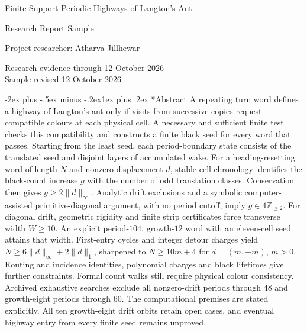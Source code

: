 \documentclass[11pt,letterpaper]{article}
\makeatletter
\renewcommand\section{\@startsection{section}{1}{\z@}%
  {-2ex plus -.5ex minus -.2ex}{1ex plus .2ex}%
  {\normalfont\Large\bfseries}}
\makeatother
\begin{document}
\begin{titlepage}
\centering
\vspace*{.8in}
{\LARGE Finite-Support Periodic Highways of Langton's Ant\par}
\vspace{.4in}
{\Large Research Report Sample\par}
\vspace{.6in}
{\large Project researcher: Atharva Jillhewar\par}
\vfill
Research evidence through 12 October 2026\\
Sample revised 12 October 2026\par
\end{titlepage}
\clearpage
\thispagestyle{empty}
\section*{Abstract}
A repeating turn word defines a highway of Langton's ant only if visits
from successive copies request compatible colours at each physical cell.
A necessary and sufficient finite test checks this compatibility and
constructs a finite black seed for every word that passes. Starting from
the least seed, each period-boundary state consists of the translated
seed and disjoint layers of accumulated wake. For a heading-resetting word of length $N$ and nonzero displacement
$d$, stable cell chronology identifies the black-count increase $g$ with
the number of odd translation classes. Conservation then gives
$g\ge2\|d\|_\infty$. Analytic drift exclusions and a symbolic
computer-assisted primitive-diagonal argument, with no period cutoff,
imply $g\in4\mathbb Z_{\ge2}$. For diagonal drift, geometric rigidity
and finite strip certificates force transverse width $W\ge10$.
An explicit period-$104$, growth-$12$ word with an eleven-cell seed
attains that width. First-entry cycles and integer detour charges yield
$N\ge6\|d\|_\infty+2\|d\|_1$, sharpened to $N\ge10m+4$
for $d=(m,-m)$, $m>0$. Routing and incidence identities, polynomial charges and black lifetimes
give further constraints. Formal count walks still require physical
colour consistency. Archived exhaustive
searches exclude all nonzero-drift periods through $48$ and growth-eight
periods through $60$. The computational premises are stated explicitly. All ten growth-eight
drift orbits retain open cases, and eventual highway entry from every
finite seed remains unproved.
\clearpage
{}
\pagestyle{fancy}
\end{document}
